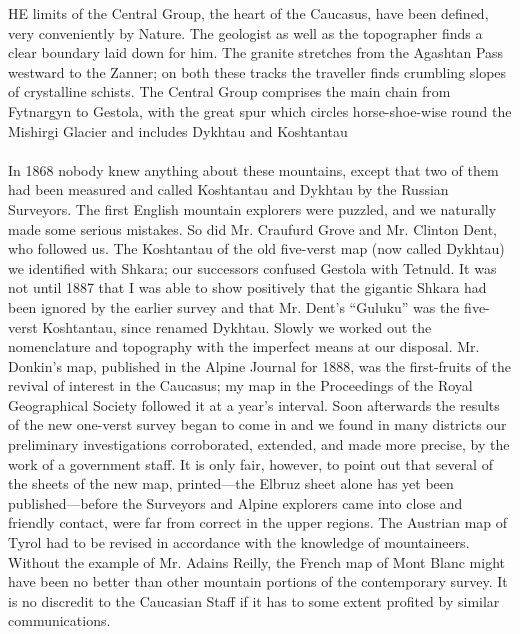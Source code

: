 \documentclass[25pt, a4paper]{article}
\begin{document}
\normalsize HE limits of the Central Group, the heart of the Caucasus, have been defined, very conveniently by Nature. The geologist as well as the topographer finds a clear boundary laid down for him. The granite stretches from the Agashtan Pass westward to the Zanner; on both these tracks the traveller finds crumbling slopes of crystalline schists. The Central Group comprises the main chain from Fytnargyn to Gestola, with the great spur which circles horse-shoe-wise round the Mishirgi Glacier and includes Dykhtau and Koshtantau

\paragraph{} In 1868 nobody knew anything about these mountains, except that two of them had been measured and called Koshtantau and Dykhtau by the Russian Surveyors. The first English mountain explorers were puzzled, and we naturally made some serious mistakes. So did Mr. Craufurd Grove and Mr. Clinton Dent, who followed us. The Koshtantau of the old five-verst map (now called Dykhtau) we identified with Shkara; our successors confused Gestola with Tetnuld. It was not until 1887 that I was able to show positively that the gigantic Shkara had been ignored by the earlier survey and that Mr. Dent's “Guluku” was the five-verst Koshtantau, since renamed Dykhtau. Slowly we worked out the nomenclature and topography with the imperfect means at our disposal. Mr. Donkin's map, published in the Alpine Journal for 1888, was the first-fruits of the revival of interest in the Caucasus; my map in the Proceedings of the Royal Geographical Society followed it at a year's interval. Soon afterwards the results of the new one-verst survey began to come in and we found in many districts our preliminary investigations corroborated, extended, and made more precise, by the work of a government staff. It is only fair, however, to point out that several of the sheets of the new map, printed—the Elbruz sheet alone has yet been published—before the Surveyors and Alpine explorers came into close and friendly contact, were far from correct in the upper regions. The Austrian map of Tyrol had to be revised in accordance with the knowledge of mountaineers. Without the example of Mr. Adains Reilly, the French map of Mont Blanc might have been no better than other mountain portions of the contemporary survey. It is no discredit to the Caucasian Staff if it has to some extent profited by similar communications.
	
\end{document}
